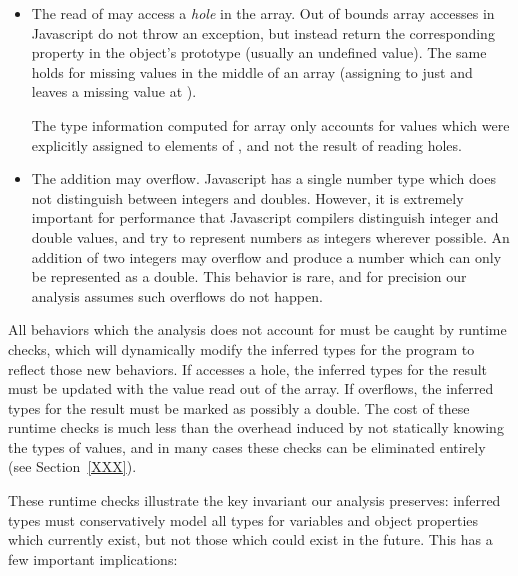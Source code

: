 \begin{itemize}

\item The read of  may access a {\it hole} in the array.
Out of bounds array accesses in Javascript do not throw an exception,
but instead return the corresponding property in the object's prototype
(usually an undefined value).
The same holds for missing values in the middle of an array
(assigning to just  and  leaves a missing
value at ).

The type information computed for array  only accounts for
values which were explicitly assigned to elements of , and not the
result of reading holes.

\item The addition  may overflow.
Javascript has a single number type which does not distinguish between
integers and doubles.
However, it is extremely important for performance that Javascript compilers
distinguish integer and double values, and try to represent numbers as
integers wherever possible.
An addition of two integers may overflow and produce a number which can
only be represented as a double.
This behavior is rare, and for precision our analysis assumes
such overflows do not happen.

\end{itemize}

All behaviors which the analysis does not account for must be caught
by runtime checks, which will dynamically modify the inferred types
for the program to reflect those new behaviors.
If  accesses a hole, the inferred types for the result must be
updated with the value read out of the array.
If  overflows, the inferred types for the result must be
marked as possibly a double.
The cost of these runtime checks is much less than the overhead induced
by not statically knowing the types of values, and in many cases these
checks can be eliminated entirely (see Section~\ref{XXX}).

These runtime checks illustrate the key invariant our analysis
preserves: inferred types must conservatively model all types for
variables and object properties which currently exist, but not those
which could exist in the future.
This has a few important implications:

